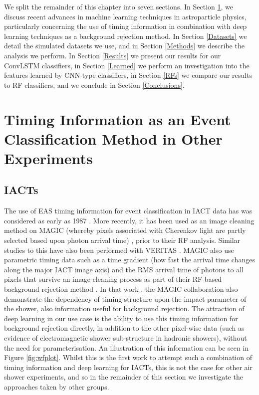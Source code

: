 We split the remainder of this chapter into seven sections. In Section \ref{RelatedWork}, we discuss recent advances in machine learning techniques in astroparticle physics, particularly concerning the use of timing information in combination with deep learning techniques as a background rejection method. In Section \ref{Datasets} we detail the simulated datasets we use, and in Section \ref{Methods} we describe the analysis we perform. In Section \ref{Results} we present our results for our ConvLSTM classifiers, in Section \ref{Learned} we perform an investigation into the features learned by CNN-type classifiers, in Section \ref{RFs} we compare our results to RF classifiers, and we conclude in Section \ref{Conclusions}. 

\section{Timing Information as an Event Classification Method in Other Experiments}

\label{RelatedWork}

\subsection{IACTs}
The use of EAS timing information for event classification in IACT data has was considered as early as 1987 \cite{paulathesis}. More recently, it has been used as an image cleaning method on MAGIC (whereby pixels associated with Cherenkov light are partly selected based upon photon arrival time) \cite{magictime}, prior to their RF analysis. Similar studies to this have also been performed with VERITAS \cite{jamietime}. MAGIC also use parametric timing data such as a time gradient (how fast the arrival time changes along the major IACT image axis) and the RMS arrival time of photons to all pixels that survive an image cleaning process as part of their RF-based background rejection method \cite{supermagictime}. In that work \cite{supermagictime}, the MAGIC collaboration also demonstrate the dependency of timing structure upon the impact parameter of the shower, also information useful for background rejection. The attraction of deep learning in our use case is the ability to use this timing information for background rejection directly, in addition to the other pixel-wise data (such as evidence of electromagnetic shower sub-structure in hadronic showers), without the need for parameterisation. An illustration of this information can be seen in Figure \ref{fig:wfplot}. Whilst this is the first work to attempt such a combination of timing information and deep learning for IACTs, this is not the case for other air shower experiments, and so in the remainder of this section we investigate the approaches taken by other groups.

